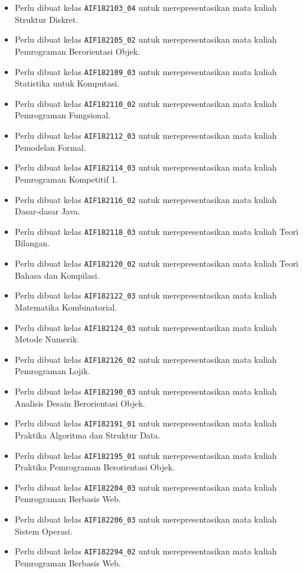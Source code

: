 \begin{enumerate}
\begin{itemize}
		\item Perlu dibuat kelas \texttt{AIF182103\_04} untuk merepresentasikan mata kuliah Struktur Diskret.
		\item Perlu dibuat kelas \texttt{AIF182105\_02} untuk merepresentasikan mata kuliah Pemrograman Berorientasi Objek.
		\item Perlu dibuat kelas \texttt{AIF182109\_03} untuk merepresentasikan mata kuliah Statistika untuk Komputasi.
		\item Perlu dibuat kelas \texttt{AIF182110\_02} untuk merepresentasikan mata kuliah Pemrograman Fungsional.
		\item Perlu dibuat kelas \texttt{AIF182112\_03} untuk merepresentasikan mata kuliah Pemodelan Formal.
		\item Perlu dibuat kelas \texttt{AIF182114\_03} untuk merepresentasikan mata kuliah Pemrograman Kompetitif 1.
		\item Perlu dibuat kelas \texttt{AIF182116\_02} untuk merepresentasikan mata kuliah Dasar-dasar Java.
		\item Perlu dibuat kelas \texttt{AIF182118\_03} untuk merepresentasikan mata kuliah Teori Bilangan.
		\item Perlu dibuat kelas \texttt{AIF182120\_02} untuk merepresentasikan mata kuliah Teori Bahasa dan Kompilasi.
		\item Perlu dibuat kelas \texttt{AIF182122\_03} untuk merepresentasikan mata kuliah Matematika Kombinatorial.
		\item Perlu dibuat kelas \texttt{AIF182124\_03} untuk merepresentasikan mata kuliah Metode Numerik.
		\item Perlu dibuat kelas \texttt{AIF182126\_02} untuk merepresentasikan mata kuliah Pemrograman Lojik.
		\item Perlu dibuat kelas \texttt{AIF182190\_03} untuk merepresentasikan mata kuliah Analisis Desain Berorientasi  Objek.
		\item Perlu dibuat kelas \texttt{AIF182191\_01} untuk merepresentasikan mata kuliah Praktika Algoritma dan Struktur Data.
		\item Perlu dibuat kelas \texttt{AIF182195\_01} untuk merepresentasikan mata kuliah Praktika Pemrograman Berorientasi Objek.
		\item Perlu dibuat kelas \texttt{AIF182204\_03} untuk merepresentasikan mata kuliah Pemrograman Berbasis Web.
		\item Perlu dibuat kelas \texttt{AIF182206\_03} untuk merepresentasikan mata kuliah Sistem Operasi.
		\item Perlu dibuat kelas \texttt{AIF182294\_02} untuk merepresentasikan mata kuliah Pemrograman Berbasis Web.

\end{itemize}
\end{enumerate}

